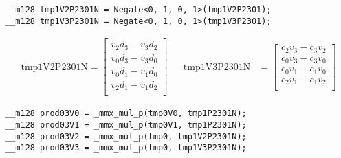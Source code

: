 \documentclass[]{scrartcl}
\begin{document}
\begin{verbatim}
__m128 tmp1V2P2301N = Negate<0, 1, 0, 1>(tmp1V2P2301);
__m128 tmp1V3P2301N = Negate<0, 1, 0, 1>(tmp1V3P2301);
\end{verbatim}

\begin{align*}
\mathrm{tmp1V2P2301N} 
=
\begin{bmatrix}
v_2d_3 - v_3d_2\\
v_0d_3 - v_3d_0\\
v_0d_1 - v_1d_0\\
v_2d_1 - v_1d_2\\
\end{bmatrix}
&&
\mathrm{tmp1V3P2301N} 
&=
\begin{bmatrix}
c_2v_3 - c_3v_2\\
c_0v_3 - c_3v_0\\
c_0v_1 - c_1v_0\\
c_2v_1 - c_1v_2\\
\end{bmatrix}
\end{align*}

\begin{verbatim}
__m128 prod03V0 = _mmx_mul_p(tmp0V0, tmp1P2301N);
__m128 prod03V1 = _mmx_mul_p(tmp0V1, tmp1P2301N);
__m128 prod03V2 = _mmx_mul_p(tmp0, tmp1V2P2301N);
__m128 prod03V3 = _mmx_mul_p(tmp0, tmp1V3P2301N);
\end{verbatim}
\end{document}
